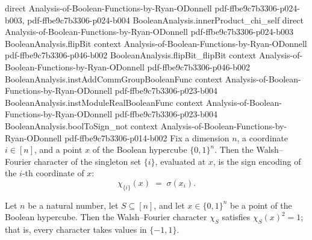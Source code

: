 \begin{lemma}
  {direct}
  {Analysis-of-Boolean-Functions-by-Ryan-ODonnell}
  {pdf-ffbe9c7b3306-p024-b003,
    pdf-ffbe9c7b3306-p024-b004}
\proofstep
  {BooleanAnalysis.innerProduct_chi_self}
  {direct}
  {Analysis-of-Boolean-Functions-by-Ryan-ODonnell}
  {pdf-ffbe9c7b3306-p024-b003}
\proofstep
  {BooleanAnalysis.flipBit}
  {context}
  {Analysis-of-Boolean-Functions-by-Ryan-ODonnell}
  {pdf-ffbe9c7b3306-p046-b002}
\proofstep
  {BooleanAnalysis.flipBit_flipBit}
  {context}
  {Analysis-of-Boolean-Functions-by-Ryan-ODonnell}
  {pdf-ffbe9c7b3306-p046-b002}
\proofstep
  {BooleanAnalysis.instAddCommGroupBooleanFunc}
  {context}
  {Analysis-of-Boolean-Functions-by-Ryan-ODonnell}
  {pdf-ffbe9c7b3306-p023-b004}
\proofstep
  {BooleanAnalysis.instModuleRealBooleanFunc}
  {context}
  {Analysis-of-Boolean-Functions-by-Ryan-ODonnell}
  {pdf-ffbe9c7b3306-p023-b004}
\proofstep
  {BooleanAnalysis.boolToSign_not}
  {context}
  {Analysis-of-Boolean-Functions-by-Ryan-ODonnell}
  {pdf-ffbe9c7b3306-p014-b002}
Fix a dimension $n$, a coordinate $i \in [n]$, and a point $x$ of the Boolean hypercube
$\{0,1\}^n$. Then the Walsh--Fourier character of the singleton set $\{i\}$, evaluated
at $x$, is the sign encoding of the $i$-th coordinate of $x$:
\[
  \chi_{\{i\}}(x) \;=\; \sigma(x_i).
\]
\end{lemma}

\begin{lemma}
\label{BooleanAnalysis.chiS_sq_eq_one}
\leanok
{}
Let $n$ be a natural number, let $S \subseteq [n]$, and let $x \in \{0,1\}^n$ be a point
of the Boolean hypercube. Then the Walsh--Fourier character $\chi_S$ satisfies
$\chi_S(x)^2 = 1$; that is, every character takes values in $\{-1, 1\}$.
\end{lemma}


